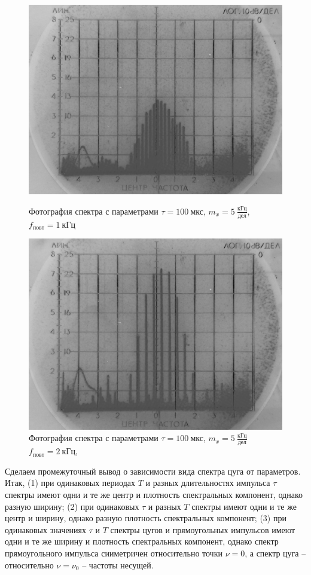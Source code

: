\documentclass[a4paper,10pt]{article}
\begin{document}
\begin{figure}[h]
	\centering
	\includegraphics[scale=0.40]{Spectr_3}
	\caption{Фотография спектра с параметрами $\tau=100~\text{мкс}$, $m_x=5~\frac{\text{кГц}}{\text{дел}}$, $f_{повт}=1~\text{кГц}$} \label{Spectr_3}
	\includegraphics[scale=0.40]{Spectr_4}
	\caption{Фотография спектра с параметрами $\tau=100~\text{мкс}$, $m_x=5~\frac{\text{кГц}}{\text{дел}}$$f_{повт}=2~\text{кГц}$, } \label{Spectr_4}
\end{figure}

Сделаем промежуточный вывод о зависимости вида спектра цуга от параметров. Итак, (1) при одинаковых периодах $T$ и разных длительностях импульса $\tau$ спектры имеют одни и те же центр и плотность спектральных компонент, однако разную ширину; (2) при одинаковых $\tau$ и разных $T$ спектры имеют одни и те же центр и ширину, однако разную плотность спектральных компонент; (3) при одинаковых значениях $\tau$ и $T$ спектры цугов и прямоугольных импульсов имеют одни и те же ширину и плотность спектральных компонент, однако спектр прямоугольного импульса сииметричен относительно точки $\nu=0$, а спектр цуга -- относительно $\nu=\nu_0$ -- частоты несущей.
\end{document}
